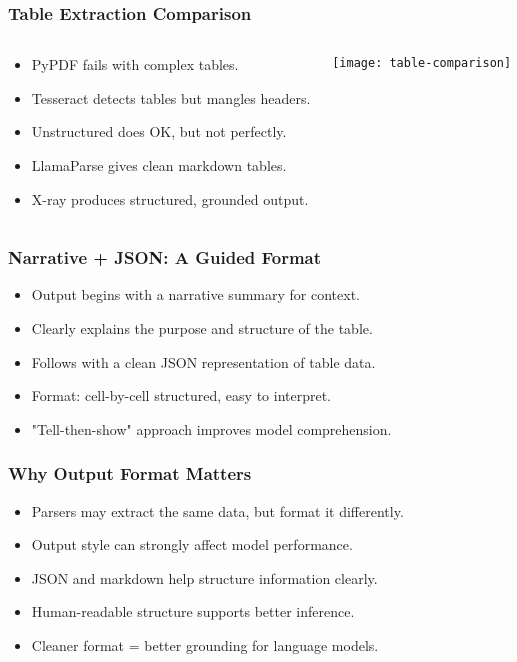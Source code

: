 \begin{frame}[fragile]\frametitle{Table Extraction Comparison}
\begin{columns}
  \begin{column}[T]{0.6\linewidth}
    \begin{itemize}
      \item PyPDF fails with complex tables.
      \item Tesseract detects tables but mangles headers.
      \item Unstructured does OK, but not perfectly.
      \item LlamaParse gives clean markdown tables.
      \item X-ray produces structured, grounded output.
    \end{itemize}
  \end{column}
  \begin{column}[T]{0.4\linewidth}
    \begin{center}
      \texttt{[image: table-comparison]}
    \end{center}
  \end{column}
\end{columns}
\end{frame}

\begin{frame}[fragile]\frametitle{Narrative + JSON: A Guided Format}
  \begin{itemize}
    \item Output begins with a narrative summary for context.
    \item Clearly explains the purpose and structure of the table.
    \item Follows with a clean JSON representation of table data.
    \item Format: cell-by-cell structured, easy to interpret.
    \item "Tell-then-show" approach improves model comprehension.
  \end{itemize}
\end{frame}

\begin{frame}[fragile]\frametitle{Why Output Format Matters}
  \begin{itemize}
    \item Parsers may extract the same data, but format it differently.
    \item Output style can strongly affect model performance.
    \item JSON and markdown help structure information clearly.
    \item Human-readable structure supports better inference.
    \item Cleaner format = better grounding for language models.
  \end{itemize}
\end{frame}

